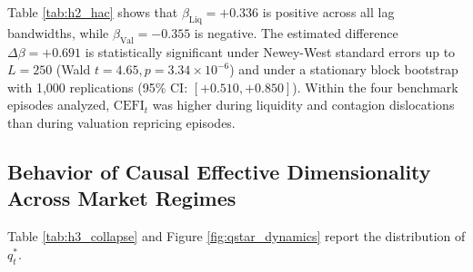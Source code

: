 \documentclass[review,12pt,authoryear]{elsarticle}
\begin{document}
\begin{table}[htbp]
\centering
\caption{Event Study Regressions: Sensitivity Across HAC Lag Bandwidths ($L = 20, 40, 60, 120, 250$)}
\label{tab:h2_hac}
\end{table}

Table \ref{tab:h2_hac} shows that $\beta_{\text{Liq}} = +0.336$ is positive across all lag bandwidths, while $\beta_{\text{Val}} = -0.355$ is negative. The estimated difference $\Delta \beta = +0.691$ is statistically significant under Newey-West standard errors up to $L=250$ (Wald $t = 4.65, p = 3.34 \times 10^{-6}$) and under a stationary block bootstrap \citep{politis1994stationary} with 1,000 replications (95\% CI: $[+0.510, +0.850]$). Within the four benchmark episodes analyzed, $\mathrm{CEFI}_t$ was higher during liquidity and contagion dislocations than during valuation repricing episodes.

\subsection{Behavior of Causal Effective Dimensionality Across Market Regimes}
Table \ref{tab:h3_collapse} and Figure \ref{fig:qstar_dynamics} report the distribution of $q_t^*$.
\end{document}
